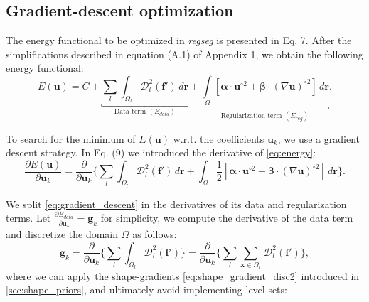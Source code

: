\documentclass[a4paper]{report}
\providecommand{\mdist}[2]{ \mathcal{D}_{#2}^2(\mathbf{#1}) }
\renewcommand{\vec}[1]{\mathbf{#1}}
\begin{document}
\subsection{Gradient-descent optimization}\label{sec:gradient_descent}
The energy functional to be optimized in \emph{regseg} is presented in Eq. 7.
After the simplifications described in equation (A.1) of Appendix 1, we obtain the
  following energy functional:
  \begin{equation}
  E(\vec{u}) = C + \underbracket{\underset{l}{\sum} \int_{\Omega_l}
  \mdist{f'}{l} \,d\vec{r}}_{\text{Data term } (E_{data})}
  + \underbracket{\underset{\Omega}{\int} \left[ \boldsymbol{\alpha} \cdot \vec{u}^{\circ2}
  + \boldsymbol{\beta} \cdot (\nabla \vec{u})^{\circ2} \right] \,d\vec{r}}_{\text{Regularization term } (E_{reg})}.
  \label{eq:energy}
  \end{equation}

To search for the minimum of $E(\vec{u})$ w.r.t. the coefficients $\vec{u}_k$, we use a gradient descent strategy.
In Eq. (9) we introduced the derivative of \eqref{eq:energy}:
  \begin{equation}
  \frac{\partial E(\vec{u})}{\partial \vec{u}_k} =
  \frac{ \partial }{\partial \vec{u}_k} \Big\{
  \underset{l}{\sum} \int_{\Omega_l} \mdist{f'}{l} \,d\vec{r}
  + \int_{\Omega} \frac12 [ \boldsymbol{\alpha} \cdot \vec{u}^{\circ2}
  + \boldsymbol{\beta} \cdot (\nabla \vec{u})^{\circ2} ] \,d\vec{r}
  \Big\}.
  \label{eq:gradient_descent}
  \end{equation}

We split \eqref{eq:gradient_descent} in the derivatives of its data and regularization terms.
Let $\frac{\partial E_{data}}{\partial \vec{u}_k} = \vec{g}_k$ for simplicity,
  we compute the derivative of the data term and discretize the domain $\Omega$ as follows:
\begin{equation}
  \vec{g}_k =
  \frac{ \partial }{\partial \vec{u}_k} \Big\{
  \underset{l}{\sum} \int_{\Omega_l} \mdist{f'}{l} \Big\} =
  \frac{ \partial }{\partial \vec{u}_k} \Big\{ \underset{l}{\sum} \underset{\vec{x} \in \Omega_l}{\sum} \, \mdist{f'}{l} \Big\},
  \label{eq:data_derivative}
\end{equation}
  where we can apply the shape-gradients \eqref{eq:shape_gradient_disc2} introduced
  in \autoref{sec:shape_priors}, and ultimately avoid implementing level sets:
\end{document}
